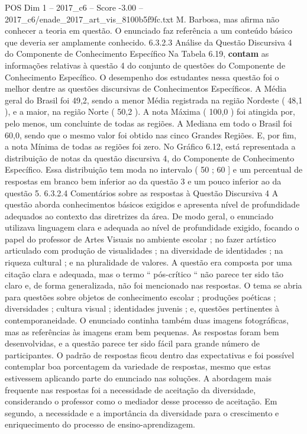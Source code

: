 \begin{textsample}{POS Dim 1 – 2017\_c6 – Score -3.00 – 2017\_c6/enade\_2017\_art\_vis\_8100b5f9fc.txt}
M.
Barbosa, mas afirma não conhecer a teoria em questão.
O enunciado faz referência a um conteúdo básico que deveria ser amplamente conhecido. 6.3.2.3 Análise da Questão Discursiva 4 do Componente de Conhecimento Específico Na Tabela 6.19, \textbf{contam} as informações relativas à questão 4 do conjunto de questões do Componente de Conhecimento Específico.
O desempenho dos estudantes nessa questão foi o melhor dentre as questões discursivas de Conhecimentos Específicos.
A Média geral do Brasil foi 49,2, sendo a menor Média registrada na região Nordeste ( 48,1 ), e a maior, na região Norte ( 50,2 ).
A nota Máxima ( 100,0 ) foi atingida por, pelo menos, um concluinte de todas as regiões.
A Mediana em todo o Brasil foi 60,0, sendo que o mesmo valor foi obtido nas cinco Grandes Regiões.
E, por fim, a nota Mínima de todas as regiões foi zero.
No Gráfico 6.12, está representada a distribuição de notas da questão discursiva 4, do Componente de Conhecimento Específico.
Essa distribuição tem moda no intervalo ( 50 ; 60 ] e um percentual de respostas em branco bem inferior ao da questão 3 e um pouco inferior ao da questão 5. 6.3.2.4 Comentários sobre as respostas à Questão Discursiva 4 A questão aborda conhecimentos básicos exigidos e apresenta nível de profundidade adequados ao contexto das diretrizes da área.
De modo geral, o enunciado utilizava linguagem clara e adequada ao nível de profundidade exigido, focando o papel do professor de Artes Visuais no ambiente escolar ; no fazer artístico articulado com produção de visualidades ; na diversidade de identidades ; na riqueza cultural ; e na pluralidade de valores.
A questão era composta por uma citação clara e adequada, mas o termo “ pós-crítico “ não parece ter sido tão claro e, de forma generalizada, não foi mencionado nas respostas.
O tema se abria para questões sobre objetos de conhecimento escolar ; produções poéticas ; diversidades ; cultura visual ; identidades juvenis ; e, questões pertinentes à contemporaneidade.
O enunciado continha também duas imagens fotográficas, mas as referências às imagens eram bem pequenas.
As respostas foram bem desenvolvidas, e a questão parece ter sido fácil para grande número de participantes.
O padrão de respostas ficou dentro das expectativas e foi possível contemplar boa porcentagem da variedade de respostas, mesmo que estas estivessem aplicando parte do enunciado nas soluções.
A abordagem mais frequente nas respostas foi a necessidade de aceitação da diversidade, considerando o professor como o mediador desse processo de aceitação.
Em segundo, a necessidade e a importância da diversidade para o crescimento e enriquecimento do processo de ensino-aprendizagem.

\end{textsample}
